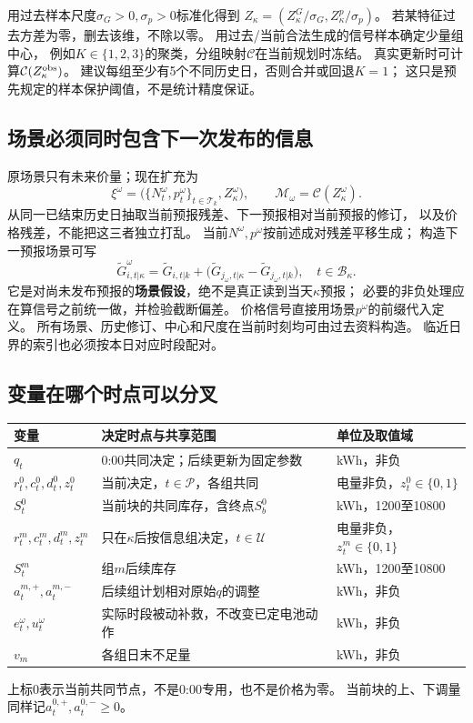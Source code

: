 \documentclass[UTF8,11pt]{ctexart}
\begin{document}
用过去样本尺度$\sigma_G>0,\sigma_p>0$标准化得到
$Z_\kappa=(Z^G_\kappa/\sigma_G,Z^p_\kappa/\sigma_p)$。
若某特征过去方差为零，删去该维，不除以零。
用过去/当前合法生成的信号样本确定少量组中心，
例如$K\in\{1,2,3\}$的聚类，分组映射$\mathcal C$在当前规划时冻结。
真实更新时可计算$\mathcal C(Z_\kappa^{\rm obs})$。
建议每组至少有5个不同历史日，否则合并或回退$K=1$；
这只是预先规定的样本保护阈值，不是统计精度保证。

\subsection{场景必须同时包含下一次发布的信息}
原场景只有未来价量；现在扩充为
\begin{equation}
 \xi^\omega=\bigl(\{N_t^\omega,p_t^\omega\}_{t\in\mathcal T_k},
                    Z_\kappa^\omega\bigr),\qquad
 \mathcal M_\omega=\mathcal C(Z_\kappa^\omega).
\end{equation}
从同一已结束历史日抽取当前预报残差、下一预报相对当前预报的修订，
以及价格残差，不能把这三者独立打乱。
当前$N^\omega,p^\omega$按前述成对残差平移生成；
构造下一预报场景可写
\begin{equation}
 \widetilde G^\omega_{i,t|\kappa}
 =\widetilde G_{i,t|k}
   +\bigl(\widetilde G_{j_\omega,t|\kappa}
                     -\widetilde G_{j_\omega,t|k}\bigr),
 \quad t\in\mathcal B_\kappa .
\end{equation}
它是对尚未发布预报的\textbf{场景假设}，绝不是真正读到当天$\kappa$预报；
必要的非负处理应在算信号之前统一做，并检验截断偏差。
价格信号直接用场景$p^\omega$的前缀代入定义。
所有场景、历史修订、中心和尺度在当前时刻均可由过去资料构造。
临近日界的索引也必须按本日对应时段配对。

\subsection{变量在哪个时点可以分叉}
\begin{longtable}{p{3.8cm}p{5.1cm}p{4.9cm}}
\toprule 变量 & 决定时点与共享范围 & 单位及取值域\\ \midrule
\endhead
$q_t$ & 0:00共同决定；后续更新为固定参数 & kWh，非负\\
$r_t^0,c_t^0,d_t^0,z_t^0$ & 当前决定，$t\in\mathcal P$，各组共同 & 电量非负，$z_t^0\in\{0,1\}$\\
$S_t^0$ & 当前块的共同库存，含终点$S_b^0$ & kWh，1200至10800\\
$r_t^m,c_t^m,d_t^m,z_t^m$ & 只在$\kappa$后按信息组决定，$t\in\mathcal U$ & 电量非负，$z_t^m\in\{0,1\}$\\
$S_t^m$ & 组$m$后续库存 & kWh，1200至10800\\
$a_t^{m,+},a_t^{m,-}$ & 后续组计划相对原始$q$的调整 & kWh，非负\\
$e_t^\omega,u_t^\omega$ & 实际时段被动补救，不改变已定电池动作 & kWh，非负\\
$v_m$ & 各组日末不足量 & kWh，非负\\
\bottomrule
\end{longtable}
上标0表示当前共同节点，不是0:00专用，也不是价格为零。
当前块的上、下调量同样记$a_t^{0,+},a_t^{0,-}\geq0$。
\end{document}
